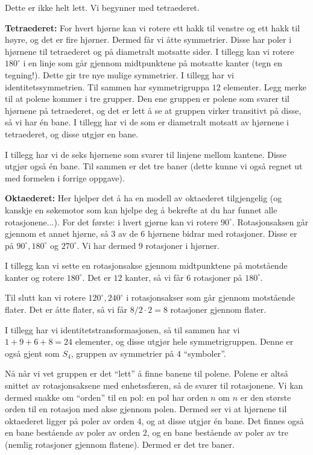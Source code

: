 \documentclass[11pt, norsk]{article}
\begin{document}
\begin{losn}
Dette er ikke helt lett. Vi begynner med tetraederet.

\textbf{Tetraederet:} For hvert hjørne kan vi rotere ett hakk til venstre og ett hakk til høyre, og det er fire hjørner. Dermed får vi åtte symmetrier. Disse har poler i hjørnene til tetraederet og på diametralt motsatte sider. I tillegg kan vi rotere $180^\circ$ i en linje som går gjennom midtpunktene på motsatte kanter (tegn en tegning!). Dette gir tre nye mulige symmetrier. I tillegg har vi identitetssymmetrien. Til sammen har symmetrigruppa $12$ elementer. Legg merke til at polene kommer i tre grupper. Den ene gruppen er polene som svarer til hjørnene på tetraederet, og det er lett å se at gruppen virker transitivt på disse, så vi har én bane. I tillegg har vi de som er diametralt motsatt av hjørnene i tetraederet, og disse utgjør en bane. 

I tillegg har vi de seks hjørnene som svarer til linjene mellom kantene. Disse utgjør også én bane. Til sammen er det tre baner (dette kunne vi også regnet ut med formelen i forrige oppgave).

\textbf{Oktaederet:} Her hjelper det å ha en modell av oktaederet tilgjengelig (og kanskje en søkemotor som kan hjelpe deg å bekrefte at du har funnet alle rotasjonene...). For det første: i hvert gjørne kan vi rotere $90^\circ$. Rotasjonsaksen går gjennom et annet hjørne, så $3$ av de $6$ hjørnene bidrar med rotasjoner. Disse er på $90^\circ,180^\circ$ og $270^\circ$.  Vi har dermed $9$ rotasjoner i hjørner.

I tillegg kan vi sette en rotasjonsakse gjennom midtpunktene på motstående kanter og rotere $180^\circ$. Det er $12$ kanter, så vi får $6$ rotasjoner på $180^\circ$.

Til slutt kan vi rotere $120^\circ, 240^\circ$ i rotasjonsakser som går gjennom motstående flater. Det er åtte flater, så vi får $8/2 \cdot 2=8$ rotasjoner gjennom flater.

I tillegg har vi identitetstransformasjonen, så til sammen har vi $1+9+6+8=24$ elementer, og disse utgjør hele symmetrigruppen. Denne er også gjent som $S_4$, gruppen av symmetrier på $4$ ``symboler''.

Nå når vi vet gruppen er det ``lett'' å finne banene til polene. Polene er altså snittet av rotasjonsaksene med enhetssfæren, så de svarer til rotasjonene. Vi kan dermed snakke om ``orden'' til en pol: en pol har orden $n$ om $n$ er den største orden til en rotasjon med akse gjennom polen. Dermed ser vi at hjørnene til oktaederet ligger på poler av orden $4$, og at disse utgjør én bane. Det finnes også en bane bestående av poler av orden $2$, og en bane bestående av poler av tre (nemlig rotasjoner gjennom flatene). Dermed er det tre baner. 


\end{losn}
\end{document}
